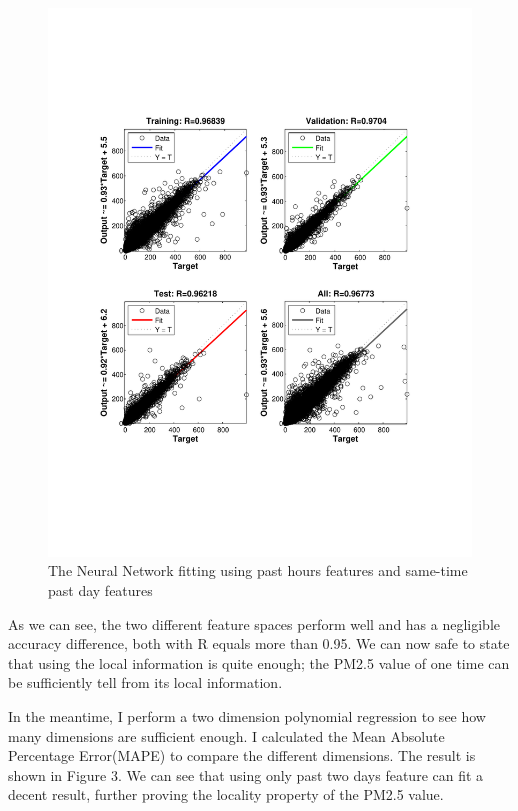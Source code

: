 \documentclass{sig-alternate}
\begin{document}
\begin{figure}[ht]
\centering
\includegraphics[scale = 0.4, trim = 300 150 300 150]{pic/reg2.pdf}
\caption{The Neural Network fitting using past hours features and same-time past day features}
\end{figure}


As we can see, the two different feature spaces perform well and has a negligible accuracy difference, both with R equals more than 0.95. We can now safe to state that using the local information is quite enough; the PM2.5 value of one time can be sufficiently tell from its local information.


In the meantime, I perform a two dimension polynomial regression to see how many dimensions are sufficient enough. I calculated the Mean Absolute Percentage Error(MAPE) to compare the different dimensions. The result is shown in Figure 3. We can see that using only past two days feature can fit a decent result, further proving the locality property of the PM2.5 value.
\end{document}

